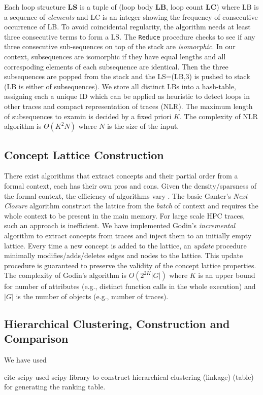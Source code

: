 Each loop structure \textbf{LS} is a tuple of (loop body \textbf{LB}, loop count \textbf{LC}) where LB is a sequence of \textit{elements} and LC is an integer showing the frequency of consecutive occurrence of LB. To avoid coincidental regularity, the algorithm needs at least three consecutive terms to form a LS. The \texttt{Reduce} procedure checks to see if any three consecutive sub-sequences on top of the stack are \textit{isomorphic}. In our context, subsequences are isomorphic if they have equal lengths and all correspoding elements of each subsequence are identical. Then the three subsequences are popped from the stack and the LS=(LB,3) is pushed to stack (LB is either of subsequences). We store all distinct LBs into a hash-table, assigning each a unique ID which can be applied as heuristic to detect loops in other traces and compact representation of traces (NLR). 
 The maximum length of subsequences to examin is decided by a fixed priori $K$.  The complexity of NLR algorithm is $\Theta(K^2N)$ where $N$ is the size of the input. 
%



\subsection{Concept Lattice Construction}
\label{subsec:algo-cl}

There exist algorithms that extract concepts and their partial order from a formal context, each has their own pros and cons.
%
Given the density/sparsness of the formal context, the efficiency of algorithms vary \cite{clgenperform}.
%
The basic Ganter's \textit{Next Closure} algorithm \cite{clbook} construct the lattice from the \textit{batch} of context and requires the whole context to be present in the main memory.
%
For large scale HPC traces, such an approach is inefficient.
%
We have implemented Godin's \textit{incremental} algorithm \cite{clconst} to extract concepts from traces and inject them to an initially empty  lattice.
%
Every time a new concept is added to the lattice, an \textit{update} procedure minimally modifies/adds/deletes edges and nodes to the lattice. 
%
This update procedure is guaranteed to preserve the validity of the concept lattice properties.
%
The complexity of Godin's algorithm is $O(2^{2K}|G|)$ where $K$ is an upper bound for number of attributes (e.g., distinct function calls in the whole execution) and $|G|$ is the number of objects (e.g., number of traces).




\subsection{Hierarchical Clustering, Construction and Comparison}
 \label{subsec:algo-bscore}
We have used 

cite scipy 
used scipy library to construct hierarchical clustering (linkage) (table) for generating the ranking table. 
